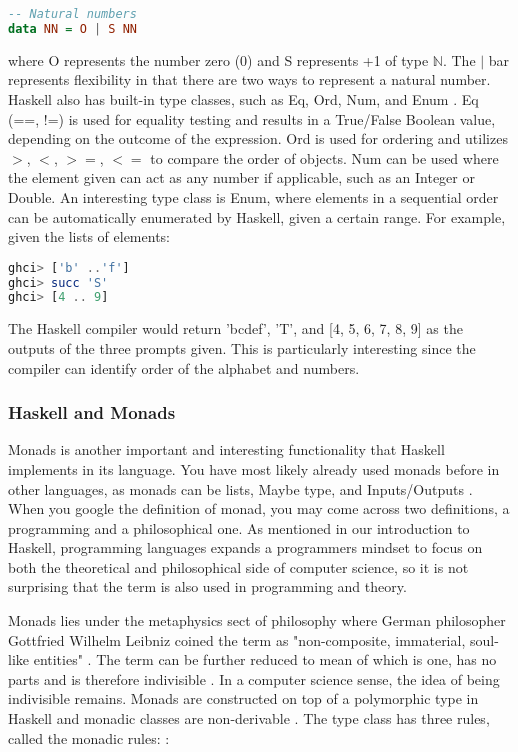 \documentclass{article}
\begin{document}
\begin{lstlisting}[language=haskell]
-- Natural numbers
data NN = O | S NN
\end{lstlisting}

\noindent 
where O represents the number zero (0) and S represents +1 of type $\mathbb N$. The $|$ bar represents flexibility in that there are two ways to represent a natural number. Haskell also has built-in type classes, such as Eq, Ord, Num, and Enum \cite{LYH Types}. Eq (==, !=) is used for equality testing and results in a True/False Boolean value, depending on the outcome of the expression. Ord is used for ordering and utilizes $>$, $<$, $>=$, $<=$ to compare the order of objects. Num can be used where the element given can act as any number if applicable, such as an Integer or Double. An interesting type class is Enum, where elements in a sequential order can be automatically enumerated by Haskell, given a certain range. For example, given the lists of elements:

\begin{lstlisting}[language=haskell]
ghci> ['b' ..'f']
ghci> succ 'S'
ghci> [4 .. 9] 
\end{lstlisting}

\noindent
The Haskell compiler would return 'bcdef', 'T', and [4, 5, 6, 7, 8, 9] as the outputs of the three prompts given. This is particularly interesting since the compiler can identify order of the alphabet and numbers. 

\subsubsection{Haskell and Monads}

Monads is another important and interesting functionality that Haskell implements in its language. You have most likely already used monads before in other languages, as monads can be lists, Maybe type, and Inputs/Outputs \cite{Haskell.org Monads}. When you google the definition of monad, you may come across two definitions, a programming and a philosophical one. As mentioned in our introduction to Haskell, programming languages expands a programmers mindset to focus on both the theoretical and philosophical side of computer science, so it is not surprising that the term is also used in programming and theory.

\medskip\noindent
Monads lies under the metaphysics sect of philosophy where German philosopher Gottfried Wilhelm Leibniz coined the term as "non-composite, immaterial, soul-like entities" \cite{IEOP}. The term can be further reduced to mean of which is one, has no parts and is therefore indivisible \cite{IEOP}. In a computer science sense, the idea of being indivisible remains. Monads are constructed on top of a polymorphic type in Haskell and monadic classes are non-derivable \cite{Haskell Monads}. The type class has three rules, called the monadic rules: \cite{TP Monads}:
\end{document}
